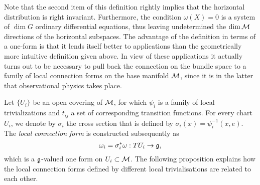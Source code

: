 \documentclass[
final,
11pt,
a4paper,
DIV=11,
headinclude=true,
footinclude=false,
bibliography=totoc,
twoside=true,  %
BCOR=5mm
]{scrbook}
\begin{document}
Note that the second item of this definition rightly implies that 
the horizontal distribution is right invariant. Furthermore, the 
condition $\omega(X) = 0$ is a system of $\dim G$ ordinary 
differential equations, thus leaving undetermined the $\dim 
\mathcal{M}$ directions of the horizontal subspaces. The advantage of 
the definition in terms of a one-form is that it lends itself 
better to applications than the geometrically more intuitive 
definition given above.  In view of these applications it 
actually turns out to be necessary to pull back the connection on 
the bundle space to a family of local connection forms on the 
base manifold $\mathcal{M}$, since it is in the latter that 
observational physics takes place.

Let $\{U_i\}$ be an open covering of $\mathcal{M}$, for which $\psi_i$ 
is a family of local trivializations and $t_{ij}$ a set of 
corresponding transition functions. For every chart $U_i$, we 
denote by $\sigma_i$ the cross section that is defined by 
$\sigma_i(x) = \psi^{-1}_i(x,e)$. The \emph{local connection 
  form} is constructed subsequently as
\begin{equation}
  \omega_i = \sigma_i^*\omega : TU_i \to \mathfrak{g},
\end{equation}
which is a $\mathfrak{g}$-valued one form on $U_i \subset \mathcal{M}$. The 
following proposition explains how the local connection forms 
defined by different local trivialisations are related to each 
other.
\end{document}
